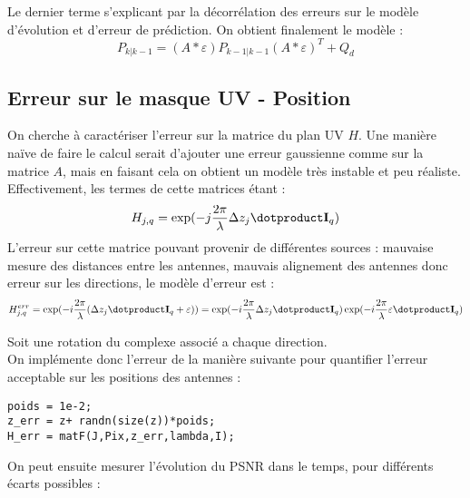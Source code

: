 \documentclass[titlepage]{article}
\begin{document}
	Le dernier terme s'explicant par la décorrélation des erreurs sur le modèle d'évolution et d'erreur de prédiction. On obtient finalement le modèle :
	\begin{equation}
		P_{k|k-1} = \left(A\ast\varepsilon\right)P_{k-1|k-1}\left(A\ast\varepsilon\right)^T + Q_d
	\end{equation}


	
	\subsection{Erreur sur le masque UV - Position}
	
	On cherche à caractériser l'erreur sur la matrice du plan UV $H$. Une manière naïve de faire le calcul serait d'ajouter une erreur gaussienne comme sur la matrice $A$, mais en faisant cela on obtient un modèle très instable et peu réaliste. Effectivement, les termes de cette matrices étant :
	$$
		H_{j,q} = \exp(-j\frac{2\pi}{\lambda}\Delta z_j\dotproduct\mathbf{I}_q)
	$$
	L'erreur sur cette matrice pouvant provenir de différentes sources : mauvaise mesure des distances entre les antennes, mauvais alignement des antennes donc erreur sur les directions, le modèle d'erreur est :
	$$
		H_{j,q}^{err} =  \exp(-i\frac{2\pi}{\lambda}(\Delta z_j\dotproduct\mathbf{I}_q + \varepsilon)) =  \exp(-i\frac{2\pi}{\lambda}\Delta z_j\dotproduct\mathbf{I}_q)\exp(-i\frac{2\pi}{\lambda}\varepsilon\dotproduct\mathbf{I}_q)
	$$
	
	Soit une rotation du complexe associé a chaque direction. \\
	
	On implémente donc l'erreur de la manière suivante pour quantifier l'erreur acceptable sur les positions des antennes :
	
	\begin{verbatim}
poids = 1e-2;
z_err = z+ randn(size(z))*poids;
H_err = matF(J,Pix,z_err,lambda,I);
	\end{verbatim}

	On peut ensuite mesurer l'évolution du PSNR dans le temps, pour différents écarts possibles :
	
%	
%	
	
\end{document}
